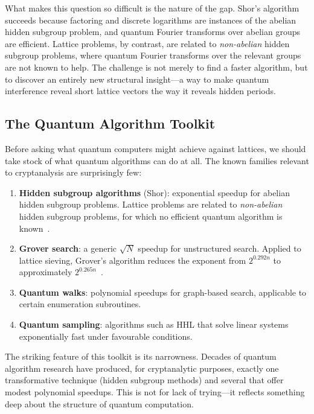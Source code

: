 What makes this question so difficult is the nature of the gap.  Shor's algorithm succeeds because factoring and discrete logarithms are instances of the abelian hidden subgroup problem, and quantum Fourier transforms over abelian groups are efficient.  Lattice problems, by contrast, are related to \emph{non-abelian} hidden subgroup problems, where quantum Fourier transforms over the relevant groups are not known to help.  The challenge is not merely to find a faster algorithm, but to discover an entirely new structural insight---a way to make quantum interference reveal short lattice vectors the way it reveals hidden periods.

\subsection{The Quantum Algorithm Toolkit}
\label{subsec:quantum-toolkit}

Before asking what quantum computers might achieve against lattices, we should take stock of what quantum algorithms can do at all.  The known families relevant to cryptanalysis are surprisingly few:
\begin{enumerate}
\item \textbf{Hidden subgroup algorithms} (Shor): exponential speedup for abelian hidden subgroup problems.  Lattice problems are related to \emph{non-abelian} hidden subgroup problems, for which no efficient quantum algorithm is known~\cite{Regev2009}.
\item \textbf{Grover search}: a generic $\sqrt{N}$ speedup for unstructured search.  Applied to lattice sieving, Grover's algorithm reduces the exponent from $2^{0.292n}$ to approximately $2^{0.265n}$~\cite{Laarhoven2015}.
\item \textbf{Quantum walks}: polynomial speedups for graph-based search, applicable to certain enumeration subroutines.
\item \textbf{Quantum sampling}: algorithms such as HHL that solve linear systems exponentially fast under favourable conditions.
\end{enumerate}

The striking feature of this toolkit is its narrowness.  Decades of quantum algorithm research have produced, for cryptanalytic purposes, exactly one transformative technique (hidden subgroup methods) and several that offer modest polynomial speedups.  This is not for lack of trying---it reflects something deep about the structure of quantum computation.

